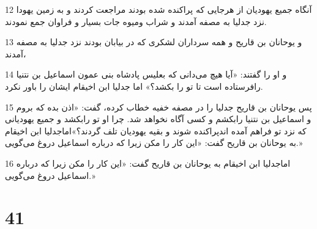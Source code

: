 \par 12 آنگاه جمیع یهودیان از هرجایی که پراکنده شده بودند مراجعت کردند و به زمین یهودا نزد جدلیا به مصفه آمدند و شراب ومیوه جات بسیار و فراوان جمع نمودند.
\par 13 و یوحانان بن قاریح و همه سرداران لشکری که در بیابان بودند نزد جدلیا به مصفه آمدند،
\par 14 و او را گفتند: «آیا هیچ می‌دانی که بعلیس پادشاه بنی عمون اسماعیل بن نتنیا رافرستاده است تا تو را بکشد؟» اما جدلیا ابن اخیقام ایشان را باور نکرد.
\par 15 پس یوحانان بن قاریح جدلیا را در مصفه خفیه خطاب کرده، گفت: «اذن بده که بروم و اسماعیل بن نتنیا رابکشم و کسی آگاه نخواهد شد. چرا او تو رابکشد و جمیع یهودیانی که نزد تو فراهم آمده اندپراکنده شوند و بقیه یهودیان تلف گردند؟»اماجدلیا ابن اخیقام به یوحانان بن قاریح گفت: «این کار را مکن زیرا که درباره اسماعیل دروغ می‌گویی.»
\par 16 اماجدلیا ابن اخیقام به یوحانان بن قاریح گفت: «این کار را مکن زیرا که درباره اسماعیل دروغ می‌گویی.»
 
\chapter{41}


